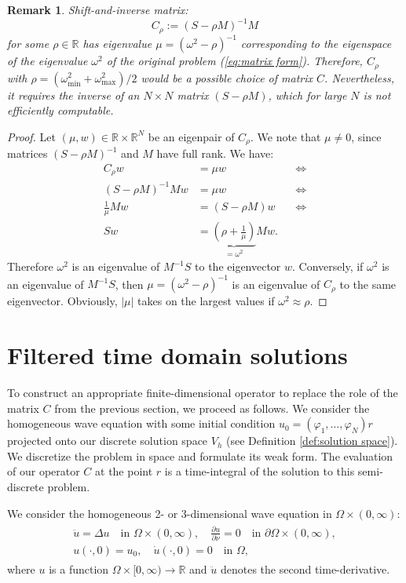 \documentclass[a4paper,11pt,bibliography=totoc,listof=totoc,headinclude=true,cleardoublepage=empty,oneside]{scrbook}
\newtheorem{rem}[theorem]{Remark}
\newcommand{\R}{\mathbb{R}}
\renewcommand{\eqref}[1]{(\ref{#1})}
\begin{document}
\begin{rem}
    Shift-and-inverse matrix:
    \begin{equation*}
        C_\rho := (S - \rho M)^{-1}M
    \end{equation*}
    for some $\rho \in \R$ has eigenvalue $\mu = (\omega^2 - \rho)^{-1}$ corresponding to the eigenspace of the eigenvalue $\omega^2$ of the original problem \eqref{eq:matrix form}. Therefore, $C_\rho$ with $\rho = (\omega^2_{\min}+\omega^2_{\max})/2 $ would be a possible choice of matrix $C$. Nevertheless, it requires the inverse of an $N\times N$ matrix $(S - \rho M)$, which for large $N$ is not efficiently computable.
\end{rem}

\begin{proof}
    Let $(\mu, w)\in \R\times\R^N$ be an eigenpair of $C_\rho$. We note that $\mu \neq 0$, since matrices $(S-\rho M)^{-1}$ and $M$ have full rank. We have:
    \begin{align*}
        C_\rho w &= \mu w &&\iff \\
        (S - \rho M)^{-1}Mw &= \mu w  &&\iff \\
        \frac{1}{\mu}Mw &= (S - \rho M)w &&\iff \\
        Sw &= \underbrace{\left(\rho + \frac{1}{\mu}\right)}_{=\omega^2} Mw.&& 
    \end{align*}
    Therefore $\omega^2$ is an eigenvalue of $M^{-1}S$ to the eigenvector $w$. Conversely, if $\omega^2$ is an eigenvalue of $M^{-1}S$, then $\mu = (\omega^2 - \rho)^{-1}$ is an eigenvalue of $C_\rho$ to the same eigenvector. Obviously, $|\mu|$ takes on the largest values if $\omega^2 \approx \rho$.
\end{proof}

\section{Filtered time domain solutions}
To construct an appropriate finite-dimensional operator to replace the role of the matrix $C$ from the previous section, we proceed as follows. We consider the homogeneous wave equation with some initial condition $u_0 = (\varphi_1, \dots, \varphi_N)r$ projected onto our discrete solution space $V_h$ (see Definition \ref{def:solution space}). We discretize the problem in space and formulate its weak form. The evaluation of our operator $C$ at the point $r$ is a time-integral of the solution to this semi-discrete problem.

We consider the homogeneous 2- or 3-dimensional wave equation in $\Omega \times (0, \infty)$:
\begin{align}
\begin{split}\label{eq:wave equation}
    \ddot{u} = \Delta u \quad \text{in } \Omega \times (0, \infty), \quad  \frac{\partial u}{\partial \nu} = 0 \quad \text{in } \partial\Omega\times (0, \infty),\\
    u( \cdot, 0)= u_0, \quad \dot{u}(\cdot, 0) = 0 \quad \text{in } \Omega,
\end{split}
\end{align}
where $u$ is a function $\Omega \times [0, \infty) \rightarrow \R$ and $\ddot{u}$ denotes the second time-derivative.
\end{document}
